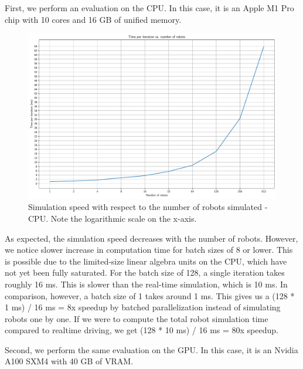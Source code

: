 \documentclass[a4paper,12pt]{article}
\begin{document}
First, we perform an evaluation on the CPU. In this case, it is an Apple M1 Pro chip with 10 cores and 16 GB of unified memory.

\begin{figure}[H]
  \centering
  \includegraphics[width=1.\textwidth]{fig/benchmark_cpu_m1.pdf}
  \caption{Simulation speed with respect to the number of robots simulated - CPU. Note the logarithmic scale on the x-axis.}
  \label{fig:cpu_speedup}
\end{figure}

As expected, the simulation speed decreases with the number of robots. However, we notice slower increase in computation time for batch sizes of 8 or lower. This is possible due to the limited-size linear algebra units on the CPU, which have not yet been fully saturated. For the batch size of 128, a single iteration takes roughly 16 ms. This is slower than the real-time simulation, which is 10 ms. In comparison, however, a batch size of 1 takes around 1 ms. This gives us a (128 * 1 ms) / 16 ms = 8x speedup by batched parallelization instead of simulating robots one by one. If we were to compute the total robot simulation time compared to realtime driving, we get (128 * 10 ms) / 16 ms = 80x speedup.

\clearpage


Second, we perform the same evaluation on the GPU. In this case, it is an Nvidia A100 SXM4 with 40 GB of VRAM.
\end{document}
